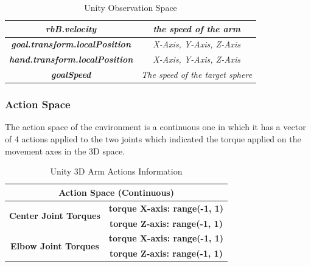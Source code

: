 \begin{table}[!htb]
\begin{tabular}{|c|l|l|c|}
						\multicolumn{3}{|c|}{\textit{\textbf{rbB.velocity}}}                      & \textit{the speed of the arm}                                                                            \\ \hline
				\multicolumn{3}{|c|}{\textit{\textbf{goal.transform.localPosition}}}      & \textit{X-Axis, Y-Axis, Z-Axis}                                                                          \\ \hline
				\multicolumn{3}{|c|}{\textit{\textbf{hand.transform.localPosition}}}      & \textit{X-Axis, Y-Axis, Z-Axis}                                                                          \\ \hline
				\multicolumn{3}{|c|}{\textit{\textbf{goalSpeed}}}                         & \textit{The speed of the target sphere}                                                                  \\ \hline
		\end{tabular}
		\caption{Unity Observation Space}
		\label{tab:unity_obs_space}
\end{table}

\subsubsection{Action Space}

The action space of the environment is a continuous one in which it has a vector of 4 actions applied to the two joints which indicated the torque applied on the movement axes in the 3D space.


\begin{table}[!htb]
		\centering

		\begin{tabular}{|c|c|l|l|}
				\hline
				\multicolumn{4}{|c|}{\textbf{Action Space (Continuous)}}                                                    \\ \hline
				\multirow{2}{*}{\textbf{Center Joint Torques}}  & \multicolumn{3}{c|}{\textbf{torque X-axis: range(-1, 1)}} \\ \cline{2-4} 
																										& \multicolumn{3}{c|}{\textbf{torque Z-axis: range(-1, 1)}} \\ \hline
				\multirow{2}{*}{\textbf{Elbow Joint Torques}}   & \multicolumn{3}{c|}{\textbf{torque X-axis: range(-1, 1)}} \\ \cline{2-4} 
																										& \multicolumn{3}{c|}{\textbf{torque Z-axis: range(-1, 1)}} \\ \hline
		\end{tabular}
		\caption{Unity 3D Arm Actions Information}
		\label{tab:unity_arm_actions}

\end{table}

